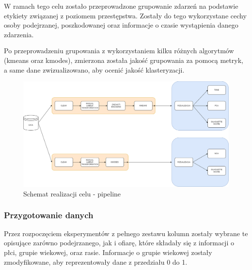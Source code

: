 \documentclass{classrep}
\begin{document}
{{{                W ramach tego celu zostało przeprowadzone grupowanie zdarzeń na podstawie etykiety związanej z poziomem przestępstwa. Zostały do tego wykorzystane cechy osoby podejrzanej, poszkodowanej oraz informacje o czasie wystąpienia danego zdarzenia.
                
                Po przeprowadzeniu grupowania z wykorzystaniem kilku
                różnych algorytmów (kmeans oraz kmodes), zmierzona
                została jakość grupowania za pomocą metryk, a same dane zwizualizowano, aby ocenić jakość klasteryzacji.
                
                \begin{figure}[!htbp]
                    \centering
                    \includegraphics[width=1\textwidth]{img/clustering/Scheme.png}
                    \caption{Schemat realizacji celu - pipeline}
                    \label{scheme}
                \end{figure}
                \FloatBarrier
            }

            \subsubsection{Przygotowanie danych} {
                Przez rozpoczęciem eksperymentów z pełnego zestawu kolumn zostały wybrane te opisujące zarówno podejrzanego, jak i ofiarę, które składały się z informacji o płci, grupie wiekowej, oraz rasie. Informacje o grupie wiekowej zostały zmodyfikowane, aby reprezentowały dane z przedziału 0 do 1.
                
}}}
\end{document}
